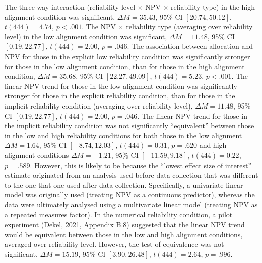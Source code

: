 \documentclass[
  english,
  man, donotrepeattitle,floatsintext]{apa7}
\theoremstyle{definition}
\theoremstyle{definition}
\theoremstyle{definition}
\theoremstyle{definition}
\theoremstyle{remark}
\begin{document}
The three-way interaction (reliability level \(\times\) NPV \(\times\) reliability
type) in the high alignment condition was significant,
\(\Delta M = 35.43\), 95\% CI \([20.74, 50.12]\), \(t(444) = 4.74\), \(p < .001\). The NPV \(\times\)
reliability type (averaging over reliability level) in the low alignment
condition was significant,
\(\Delta M = 11.48\), 95\% CI \([0.19, 22.77]\), \(t(444) = 2.00\), \(p = .046\). The association
between allocation and NPV for those in the explicit low reliability
condition was significantly stronger for those in the low alignment condition,
than for those in the high alignment condition,
\(\Delta M = 35.68\), 95\% CI \([22.27, 49.09]\), \(t(444) = 5.23\), \(p < .001\).
The linear NPV trend for those in the low alignment condition was
significantly stronger for those in the explicit reliability condition, than for
those in the implicit reliability condition (averaging over reliability level),
\(\Delta M = 11.48\), 95\% CI \([0.19, 22.77]\), \(t(444) = 2.00\), \(p = .046\). The linear
NPV trend for those in the implicit reliability condition was not
significantly ``equivalent'' between those in the low and high reliability
conditions for both those in the low alignment
\(\Delta M = 1.64\), 95\% CI \([-8.74, 12.03]\), \(t(444) = 0.31\), \(p = .620\)
and high alignment conditions
\(\Delta M = -1.21\), 95\% CI \([-11.59, 9.18]\), \(t(444) = 0.22\), \(p = .589\).
However, this is likely to be because the ``lowest effect size of interest''
estimate originated from an analysis used before data collection that was
different to the one that one used after data collection. Specifically, a
univariate linear model was originally used (treating NPV as a continuous
predictor), whereas the data were ultimately analysed using a multivariate
linear model (treating NPV as a repeated measures factor). In the numerical
reliability condition, a pilot experiment (Dekel, \protect\hyperlink{ref-dekel2021b}{2021}, Appendix B.8)
suggested that the linear NPV trend would be equivalent between those in the low
and high alignment conditions, averaged over reliability level. However, the
test of equivalence was not significant,
\(\Delta M = 15.19\), 95\% CI \([3.90, 26.48]\), \(t(444) = 2.64\), \(p = .996\).
\end{document}
